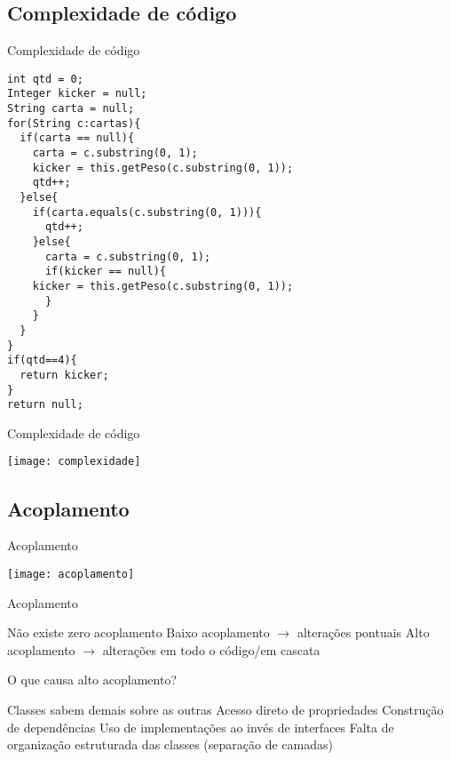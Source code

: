 \documentclass{beamer}
\begin{document}
\subsection{Complexidade de código} %

\begin{frame}[fragile]{Complexidade de código}
 \begin{verbatim}
int qtd = 0;
Integer kicker = null; 
String carta = null; 
for(String c:cartas){
  if(carta == null){
    carta = c.substring(0, 1);
    kicker = this.getPeso(c.substring(0, 1));
    qtd++;
  }else{
    if(carta.equals(c.substring(0, 1))){
      qtd++;
    }else{
      carta = c.substring(0, 1);
      if(kicker == null){
	kicker = this.getPeso(c.substring(0, 1));
      }
    }
  }
}
if(qtd==4){
  return kicker;
}
return null;
  \end{verbatim}
\end{frame}

\begin{frame}{Complexidade de código}
  \begin{center}
    \texttt{[image: complexidade]}
  \end{center}
\end{frame}

\subsection{Acoplamento} %

\begin{frame}{Acoplamento}
  \begin{center}
    \texttt{[image: acoplamento]}
  \end{center}
\end{frame}

\begin{frame}{Acoplamento}
 \begin{outline}
    Não existe zero acoplamento
    Baixo acoplamento $\rightarrow$ alterações pontuais
    Alto acoplamento $\rightarrow$ alterações em todo o código/em cascata
 \end{outline}
\end{frame}

\begin{frame}{O que causa alto acoplamento?}
 \begin{outline}
   Classes sabem \alert{demais} sobre as outras
     Acesso direto de propriedades
     Construção de dependências
     Uso de implementações ao invés de interfaces
   Falta de organização estruturada das classes (separação de camadas)
 \end{outline}
\end{frame}
\end{document}
